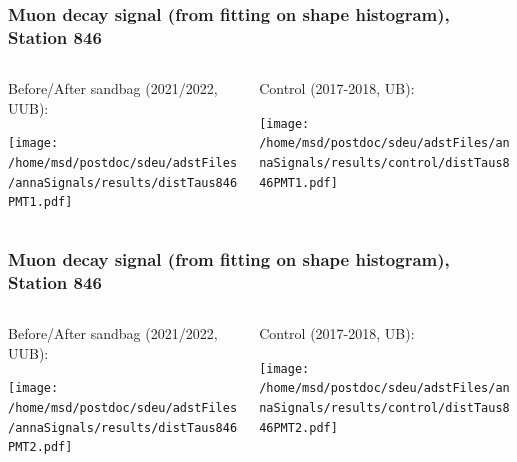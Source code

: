 \documentclass[aspectratio=169]{beamer}
\begin{document}

\begin{frame}
  \frametitle{Muon decay signal (from fitting on shape histogram), Station 846}
  
  \begin{columns}[T,c]
    \begin{column}{.5\textwidth}
      Before/After sandbag (2021/2022, UUB):
      \vspace{.3cm}

      \texttt{[image: /home/msd/postdoc/sdeu/adstFiles/annaSignals/results/distTaus846PMT1.pdf]}
    \end{column}
    \begin{column}{.5\textwidth}
      Control (2017-2018, UB):
      \vspace{0.3cm}

      \texttt{[image: /home/msd/postdoc/sdeu/adstFiles/annaSignals/results/control/distTaus846PMT1.pdf]}
    \end{column}
  \end{columns}
\end{frame}

\begin{frame}
  \frametitle{Muon decay signal (from fitting on shape histogram), Station 846}
  
  \begin{columns}[T,c]
    \begin{column}{.5\textwidth}
      Before/After sandbag (2021/2022, UUB):
      \vspace{.3cm}

      \texttt{[image: /home/msd/postdoc/sdeu/adstFiles/annaSignals/results/distTaus846PMT2.pdf]}
    \end{column}
    \begin{column}{.5\textwidth}
      Control (2017-2018, UB):
      \vspace{0.3cm}

      \texttt{[image: /home/msd/postdoc/sdeu/adstFiles/annaSignals/results/control/distTaus846PMT2.pdf]}
    \end{column}    
\end{columns}
\end{frame}
\end{document}
